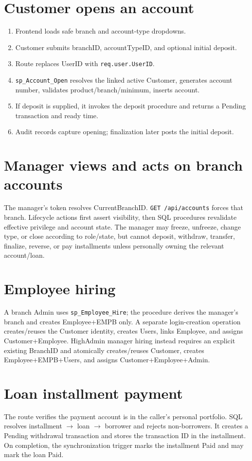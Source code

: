 \documentclass[11pt,a4paper,oneside]{report}
\begin{document}
\section{Customer opens an account}
\begin{enumerate}
\item Frontend loads safe branch and account-type dropdowns.
\item Customer submits branchID, accountTypeID, and optional initial deposit.
\item Route replaces UserID with \texttt{req.user.UserID}.
\item \texttt{sp\_Account\_Open} resolves the linked active Customer, generates account number, validates product/branch/minimum, inserts account.
\item If deposit is supplied, it invokes the deposit procedure and returns a Pending transaction and ready time.
\item Audit records capture opening; finalization later posts the initial deposit.
\end{enumerate}

\section{Manager views and acts on branch accounts}
The manager's token resolves CurrentBranchID. \texttt{GET /api/accounts} forces that branch. Lifecycle actions first assert visibility, then SQL procedures revalidate effective privilege and account state. The manager may freeze, unfreeze, change type, or close according to role/state, but cannot deposit, withdraw, transfer, finalize, reverse, or pay installments unless personally owning the relevant account/loan.

\section{Employee hiring}
A branch Admin uses \texttt{sp\_Employee\_Hire}; the procedure derives the manager's branch and creates Employee+EMPB only. A separate login-creation operation creates/reuses the Customer identity, creates Users, links Employee, and assigns Customer+Employee. HighAdmin manager hiring instead requires an explicit existing BranchID and atomically creates/reuses Customer, creates Employee+EMPB+Users, and assigns Customer+Employee+Admin.

\section{Loan installment payment}
The route verifies the payment account is in the caller's personal portfolio. SQL resolves installment $\rightarrow$ loan $\rightarrow$ borrower and rejects non-borrowers. It creates a Pending withdrawal transaction and stores the transaction ID in the installment. On completion, the synchronization trigger marks the installment Paid and may mark the loan Paid.
\end{document}
